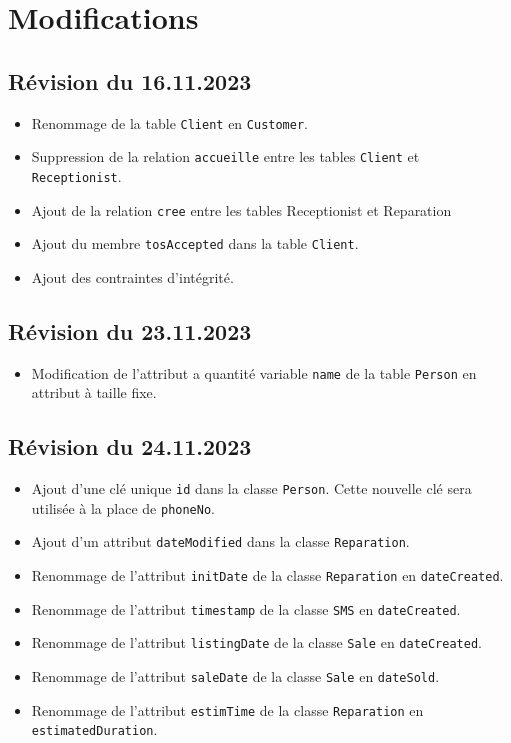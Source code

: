 \documentclass{article}
\begin{document}
\section{Modifications}

\subsection*{Révision du 16.11.2023}

\begin{itemize}
    \item Renommage de la table \texttt{Client} en \texttt{Customer}.
    \item Suppression de la relation \texttt{accueille} entre les tables \texttt{Client} et \texttt{Receptionist}.
    \item Ajout de la relation \texttt{cree} entre les tables {Receptionist} et {Reparation}
    \item Ajout du membre \texttt{tosAccepted} dans la table \texttt{Client}.
    \item Ajout des contraintes d'intégrité.
\end{itemize}

\subsection*{Révision du 23.11.2023}

\begin{itemize}
    \item Modification de l'attribut a quantité variable \texttt{name} de la table \texttt{Person} en attribut à taille fixe.
\end{itemize}

\subsection*{Révision du 24.11.2023}

\begin{itemize}
    \item Ajout d'une clé unique \texttt{id} dans la classe \texttt{Person}. Cette nouvelle clé sera utilisée à la place de \texttt{phoneNo}.
    \item Ajout d'un attribut \texttt{dateModified} dans la classe \texttt{Reparation}.
    \item Renommage de l'attribut \texttt{initDate} de la classe \texttt{Reparation} en \texttt{dateCreated}.
    \item Renommage de l'attribut \texttt{timestamp} de la classe \texttt{SMS} en \texttt{dateCreated}.
    \item Renommage de l'attribut \texttt{listingDate} de la classe \texttt{Sale} en \texttt{dateCreated}.
    \item Renommage de l'attribut \texttt{saleDate} de la classe \texttt{Sale} en \texttt{dateSold}.
    \item Renommage de l'attribut \texttt{estimTime} de la classe \texttt{Reparation} en \texttt{estimatedDuration}.
\end{itemize}
\end{document}

